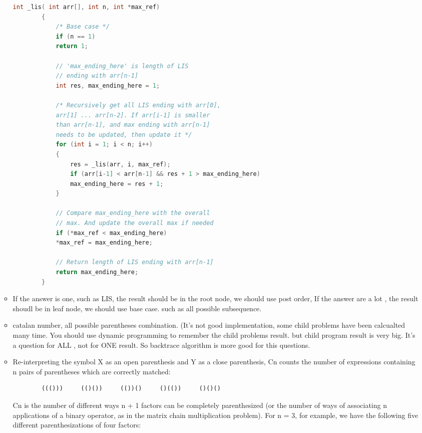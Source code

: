 \documentclass[a4paper,11pt,twoside]{book}
\begin{document}
\begin{itemize}
\begin{itemize}
	\begin{lstlisting}[frame=single, language=c++]
		int _lis( int arr[], int n, int *max_ref)
		{
			/* Base case */
			if (n == 1)
			return 1;
			
			// 'max_ending_here' is length of LIS
			// ending with arr[n-1]
			int res, max_ending_here = 1;
			
			/* Recursively get all LIS ending with arr[0],
			arr[1] ... arr[n-2]. If arr[i-1] is smaller
			than arr[n-1], and max ending with arr[n-1]
			needs to be updated, then update it */
			for (int i = 1; i < n; i++)
			{
				res = _lis(arr, i, max_ref);
				if (arr[i-1] < arr[n-1] && res + 1 > max_ending_here)
				max_ending_here = res + 1;
			}
			
			// Compare max_ending_here with the overall
			// max. And update the overall max if needed
			if (*max_ref < max_ending_here)
			*max_ref = max_ending_here;
			
			// Return length of LIS ending with arr[n-1]
			return max_ending_here;
		}
	\end{lstlisting}
	
	
	\item If the answer is one, such as LIS, the result should be in the root node, we should use post order, If the answer are a lot , the result shoudl be in leaf node, we should use base case. such as all possible subsequence. 
	
	\item catalan number, all possible parentheses combination. (It's not good implementation, some child problems have been calcualted many time.  You should use dynamic programming to remember the child problems result. but child program result is very big.  It's a question for ALL , not for ONE result. So backtrace algorithm is more good for this questions. 
	
	\item Re-interpreting the symbol X as an open parenthesis and Y as a close parenthesis, Cn counts the number of expressions containing n pairs of parentheses which are correctly matched:
	\begin{lstlisting}
		((()))     (()())     (())()     ()(())     ()()()
	\end{lstlisting}
	
	Cn is the number of different ways n + 1 factors can be completely parenthesized (or the number of ways of associating n applications of a binary operator, as in the matrix chain multiplication problem). For n = 3, for example, we have the following five different parenthesizations of four factors:
	

\end{itemize}
\end{itemize}
\end{document}
